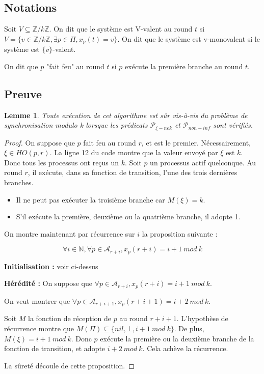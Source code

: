 \documentclass{article}
\newtheorem{lemma}{Lemme}[section]
\begin{document}
\subsection{Notations}

Soit $V \subseteq \mathds{Z}/k\mathds{Z}$. On dit que le système est V-valent au round $t$ si $V = \{v \in \mathds{Z}/k\mathds{Z}, \exists p \in \Pi, x_p(t) = v\}$.
On dit que le système est v-monovalent si le système est $\{v\}$-valent.

On dit que $p$ "fait feu" au round $t$ si $p$ exécute la première branche au round $t$.

\subsection{Preuve}

\begin{lemma}
	Toute exécution de cet algorithme est sûr vis-à-vis du problème de synchronisation modulo k lorsque les prédicats $\mathcal{P}_{\xi-nek}$ et $\mathcal{P}_{non-inf}$ sont vérifiés.
\end{lemma}
\begin{proof}

	On suppose que $p$ fait feu au round $r$, et est le premier. Nécessairement, $\xi \in HO(p,r)$.
	La ligne 12 du code montre que la valeur envoyé par $\xi$ est $k$.
	Donc tous les processus ont reçus un $k$. Soit $p$ un processus actif quelconque. Au round $r$, il exécute, dans sa fonction de transition, l'une des trois dernières branches.
	\begin{itemize}

		\item Il ne peut pas exécuter la troisième branche car $M(\xi) = k$.
		\item S'il exécute la première, deuxième ou la quatrième branche, il adopte 1.

	\end{itemize}

	On montre maintenant par récurrence sur $i$ la proposition suivante :

	$$\forall i \in \mathds{N}, \forall p \in \mathcal{A}_{r+i}, x_p(r+i) = i+1~mod~k$$

	\textbf{Initialisation : } voir ci-dessus

	\textbf{Hérédité :}
	On suppose que $\forall p \in \mathcal{A}_{r+i}, x_p(r+i) = i+1~mod~k$.

	On veut montrer que $\forall p \in \mathcal{A}_{r+i+1}, x_p(r+i+1) = i+2~mod~k$.

	Soit $M$ la fonction de réception de $p$ au round $r+i+1$.
	L'hypothèse de récurrence montre que $M(\Pi) \subseteq \{nil, \bot, i+1~mod~k\}$.
	De plus, $M(\xi) = i+1~mod~k$. Donc $p$ exécute la première ou la deuxième branche de la fonction de transition, et adopte $i+2~mod~k$.
	Cela achève la récurrence.

	La sûreté découle de cette proposition.

\end{proof}
\end{document}
